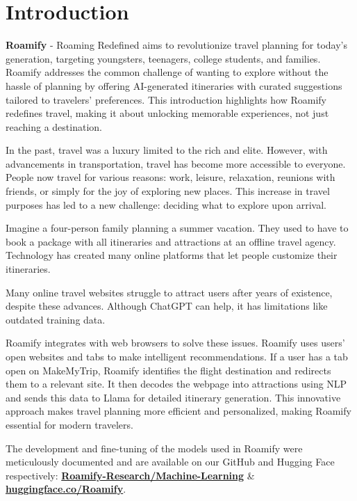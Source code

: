 \documentclass[conference]{IEEEtran}
\begin{document}
\IEEEpeerreviewmaketitle

\section{Introduction}

    \textbf{Roamify} - Roaming Redefined aims to revolutionize travel planning for today's generation, targeting youngsters, teenagers, college students, and families. Roamify addresses the common challenge of wanting to explore without the hassle of planning by offering AI-generated itineraries with curated suggestions tailored to travelers' preferences. This introduction highlights how Roamify redefines travel, making it about unlocking memorable experiences, not just reaching a destination.

    In the past, travel was a luxury limited to the rich and elite. However, with advancements in transportation, travel has become more accessible to everyone. People now travel for various reasons: work, leisure, relaxation, reunions with friends, or simply for the joy of exploring new places. This increase in travel purposes has led to a new challenge: deciding what to explore upon arrival.

    Imagine a four-person family planning a summer vacation. They used to have to book a package with all itineraries and attractions at an offline travel agency. Technology has created many online platforms that let people customize their itineraries.

    Many online travel websites struggle to attract users after years of existence, despite these advances. Although ChatGPT can help, it has limitations like outdated training data.

    Roamify integrates with web browsers to solve these issues. Roamify uses users' open websites and tabs to make intelligent recommendations. If a user has a tab open on MakeMyTrip, Roamify identifies the flight destination and redirects them to a relevant site. It then decodes the webpage into attractions using NLP and sends this data to Llama for detailed itinerary generation. This innovative approach makes travel planning more efficient and personalized, making Roamify essential for modern travelers.

    The development and fine-tuning of the models used in Roamify were meticulously documented and are available on our GitHub and Hugging Face respectively: \href{https://github.com/Roamify-Research/Machine-Learning}{\textbf{Roamify-Research/Machine-Learning}} \& \href{https://huggingface.co/Roamify}{\textbf{huggingface.co/Roamify}}.
\end{document}

